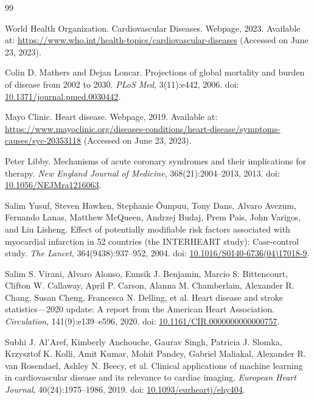 \begin{thebibliography}{99}
\small

 World Health Organization. Cardiovascular Diseases. Webpage, 2023. Available at: \url{https://www.who.int/health-topics/cardiovascular-diseases} (Accessed on June 23, 2023).

 Colin D. Mathers and Dejan Loncar. Projections of global mortality and burden of disease from 2002 to 2030. \emph{PLoS Med}, 3(11):e442, 2006. doi: \href{https://doi.org/10.1371/journal.pmed.0030442}{10.1371/journal.pmed.0030442}.

 Mayo Clinic. Heart disease. Webpage, 2019. Available at: \url{https://www.mayoclinic.org/diseases-conditions/heart-disease/symptoms-causes/syc-20353118} (Accessed on June 23, 2023).

 Peter Libby. Mechanisms of acute coronary syndromes and their implications for therapy. \emph{New England Journal of Medicine}, 368(21):2004--2013, 2013. doi: \href{https://doi.org/10.1056/NEJMra1216063}{10.1056/NEJMra1216063}.

 Salim Yusuf, Steven Hawken, Stephanie \^{O}unpuu, Tony Dans, Alvaro Avezum, Fernando Lanas, Matthew McQueen, Andrzej Budaj, Prem Pais, John Varigos, and Liu Lisheng. Effect of potentially modifiable risk factors associated with myocardial infarction in 52 countries (the INTERHEART study): Case-control study. \emph{The Lancet}, 364(9438):937--952, 2004. doi: \href{https://doi.org/10.1016/S0140-6736(04)17018-9}{10.1016/S0140-6736(04)17018-9}.

 Salim S. Virani, Alvaro Alonso, Eunsik J. Benjamin, Marcio S. Bittencourt, Clifton W. Callaway, April P. Carson, Alanna M. Chamberlain, Alexander R. Chang, Susan Cheng, Francesca N. Delling, et al. Heart disease and stroke statistics---2020 update: A report from the American Heart Association. \emph{Circulation}, 141(9):e139--e596, 2020. doi: \href{https://doi.org/10.1161/CIR.0000000000000757}{10.1161/CIR.0000000000000757}.

 Subhi J. Al'Aref, Kimberly Anchouche, Gaurav Singh, Patricia J. Slomka, Krzysztof K. Kolli, Amit Kumar, Mohit Pandey, Gabriel Maliakal, Alexander R. van Rosendael, Ashley N. Beecy, et al. Clinical applications of machine learning in cardiovascular disease and its relevance to cardiac imaging. \emph{European Heart Journal}, 40(24):1975--1986, 2019. doi: \href{https://doi.org/10.1093/eurheartj/ehy404}{10.1093/eurheartj/ehy404}.


\end{thebibliography}
